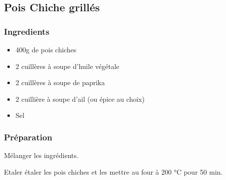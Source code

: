 \subsection{Pois Chiche grillés}
\subsubsection{Ingredients}
\begin{itemize}
	\item 400g de pois chiches
	\item 2 cuillères à soupe d'huile végétale
	\item 2 cuillères à soupe de paprika
	\item 2 cuillière à soupe d'ail (ou épice au choix)
	\item Sel
\end{itemize}

\subsubsection{Préparation}

Mélanger les ingrédients.

Etaler étaler les pois chiches et les mettre au four à 200 °C pour 50 min.
